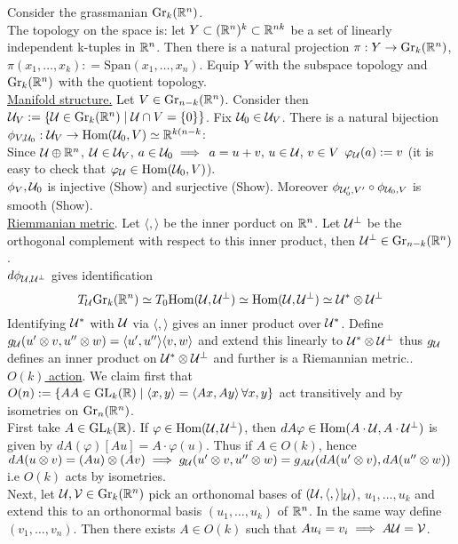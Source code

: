 \documentclass[10pt,a4paper]{article}
\begin{document}
\begin{example}[Grassmanians]
Consider the grassmanian $\text{Gr}_k(\mathbb{R}^n)$.\\
The topology on the space is: let $Y\subset (\mathbb{R}^n)^k \subset \mathbb{R}^{nk}$ be a set of linearly independent k-tuples in  $\mathbb{R}^n$. Then there is a natural projection $\pi:Y\to \text{Gr}_k(\mathbb{R}^n)$, $\pi(x_1,\ldots, x_k): = \text{Span}(x_1,\ldots, x_n)$. Equip $Y$ with the subspace topology and $\text{Gr}_k(\mathbb{R}^n)$ with the quotient topology.\\
\underline{Manifold structure.} Let $V\in \text{Gr}_{n-k}(\mathbb{R}^n)$. Consider then $\mathcal{U}_V:=\{\mathcal{U}\in \text{Gr}_k(\mathbb{R}^n)\mid \mathcal{U}\cap V = \{0\}\}$. Fix $\mathcal{U}_0\in \mathcal{U}_V$. There is a natural bijection $\phi_{V,\mathcal{U}_0}:\mathcal{U}_V \to \text{Hom}(\mathcal{U}_0,V) \simeq \mathbb{R}^{k(n-k}$:\\
Since $\mathcal{U}\oplus \mathbb{R}^n$, $\mathcal{U}\in \mathcal{U}_V$, $a\in \mathcal{U}_0 \implies$ $a = u+v,\, u\in \mathcal{U}, \,v\in V$ $\varphi_{\mathcal{U}}(a) := v$ (it is easy to check that $\varphi_{\mathcal{U}}\in \text{Hom}(\mathcal{U}_0,V)$).\\
$\phi_V,\mathcal{U}_0$ is injective (Show) and surjective (Show). Moreover $\phi_{\mathcal{U}_0',V'} \circ \phi_{\mathcal{U}_0,V}$ is smooth (Show).\\
\underline{Riemmanian metric}. Let $\langle ,\rangle$ be the inner porduct on $\mathbb{R}^n$. Let $\mathcal{U}^\perp$ be the orthogonal complement with respect to this inner product, then $\mathcal{U}^\perp \in \text{Gr}_{n-k}(\mathbb{R}^n)$.\\
$d\phi_{\mathcal{U},\mathcal{U}^\perp}$ gives identification 
\[T_{\mathcal{U}}\text{Gr}_k(\mathbb{R}^n)\simeq T_0\text{Hom}(\mathcal{U},\mathcal{U}^\perp)\simeq \text{Hom}(\mathcal{U},\mathcal{U}^\perp)\simeq \mathcal{U}^*\otimes \mathcal{U}^\perp\]
Identifying $\mathcal{U}^*$ with $\mathcal{U}$ via $\langle, \rangle$ gives an inner product over $\mathcal{U}^*$. Define $g_{\mathcal{U}}(u'\otimes v, u''\otimes w) = \langle u',u''\rangle\langle v,w \rangle$ and extend this linearly to $\mathcal{U}^*\otimes \mathcal{U}^\perp$ thus $g_{\mathcal{U}}$ defines an inner product on $\mathcal{U}^*\otimes \mathcal{U}^\perp$ and further is a Riemannian metric..\\
\underline{$O(k)$ action}. We claim first that $O(n):=\{AA\in \text{GL}_k(\mathbb{R})\mid \langle x,y \rangle = \langle Ax, Ay\rangle\, \forall x,y\}$  act transitively and by isometries on $\text{Gr}_n(\mathbb{R}^n)$. \\
First take $A\in \text{GL}_k(\mathbb{R})$. If $\varphi\in \text{Hom}(\mathcal{U},\mathcal{U}^\perp)$, then $dA\varphi\in \text{Hom}(A\cdot \mathcal{U}, A\cdot \mathcal{U}^\perp)$ is given by $dA(\varphi)[Au] = A\cdot \varphi(u)$. Thus if $A\in O(k)$, hence $dA(u\otimes v) = (Au)\otimes(Av)\implies g_{\mathcal{U}}(u'\otimes v, u''\otimes w) = g_{A\mathcal{U}}(dA(u'\otimes v),dA(u''\otimes w))$ i.e $O(k)$ acts by isometries.\\
Next, let $\mathcal{U}, \mathcal{V}\in \text{Gr}_k(\mathbb{R}^n)$ pick an orthonomal bases of $(\mathcal{U},\langle,\rangle\vert_{\mathcal{U}})$, $u_1,\ldots, u_k$ and extend this to an orthonormal basis $(u_1,\ldots, u_k)$ of $\mathbb{R}^n$. In the same way define $(v_1,\ldots,v_n)$. Then there exists $A\in O(k)$ such that $Au_i = v_i\implies A\mathcal{U} = \mathcal{V}$.


\end{example}
\end{document}
